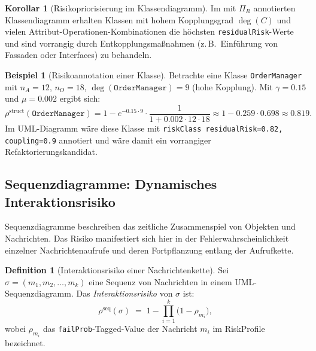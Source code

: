 ﻿\documentclass[a4paper,12pt]{article}
\theoremstyle{definition}
\newtheorem{definition}{Definition}
\newtheorem{beispiel}{Beispiel}
\newtheorem{korollar}{Korollar}
\begin{document}
\begin{korollar}[Risikopriorisierung im Klassendiagramm]
\label{kor:klasse-prio}
    Im mit $\Pi_R$ annotierten Klassendiagramm erhalten Klassen mit hohem Kopplungsgrad
    $\deg(C)$ und vielen Attribut-Operationen-Kombinationen die h\"ochsten
    \texttt{residualRisk}-Werte und sind vorrangig durch Entkopplungsma\ss{}nahmen
    (z.\,B.\ Einf\"uhrung von Fassaden oder Interfaces) zu behandeln.
\end{korollar}

\begin{beispiel}[Risikoannotation einer Klasse]
    Betrachte eine Klasse \texttt{OrderManager} mit $n_A = 12$, $n_O = 18$,
    $\deg(\texttt{OrderManager}) = 9$ (hohe Kopplung). Mit $\gamma = 0.15$ und
    $\mu = 0.002$ ergibt sich:
    \[
        \rho^{\mathrm{struct}}(\texttt{OrderManager})
        = 1 - e^{-0.15 \cdot 9} \cdot \frac{1}{1 + 0.002 \cdot 12 \cdot 18}
        \approx 1 - 0.259 \cdot 0.698 \approx 0.819.
    \]
    Im UML-Diagramm w\"are diese Klasse mit
    \texttt{\guillemotleft{}riskClass\guillemotright{} residualRisk=0.82, coupling=0.9}
    annotiert und w\"are damit ein vorrangiger Refaktorierungskandidat.
\end{beispiel}

\subsection{Sequenzdiagramme: Dynamisches Interaktionsrisiko}

Sequenzdiagramme beschreiben das zeitliche Zusammenspiel von Objekten und Nachrichten.
Das Risiko manifestiert sich hier in der Fehlerwahrscheinlichkeit einzelner
Nachrichtenaufrufe und deren Fortpflanzung entlang der Aufrufkette.

\begin{definition}[Interaktionsrisiko einer Nachrichtenkette]
\label{def:interaktionsrisiko}
    Sei $\sigma = (m_1, m_2, \ldots, m_k)$ eine Sequenz von Nachrichten in einem
    UML-Sequenzdiagramm. Das \emph{Interaktionsrisiko} von $\sigma$ ist:
    \[
        \rho^{\mathrm{seq}}(\sigma) \;=\; 1 - \prod_{i=1}^{k}
        \bigl(1 - \rho_{m_i}\bigr),
    \]
    wobei $\rho_{m_i}$ das \texttt{failProb}-Tagged-Value der Nachricht $m_i$ im
    \textsf{RiskProfile} bezeichnet.
\end{definition}
\end{document}
